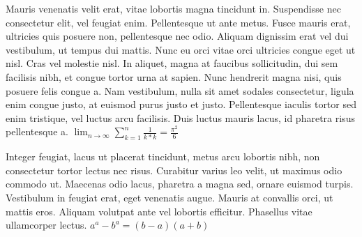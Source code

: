 \documentclass{article}
\begin{document}
Mauris venenatis velit erat, vitae lobortis magna tincidunt in. Suspendisse nec consectetur elit, vel feugiat enim. Pellentesque ut ante metus. Fusce mauris erat, ultricies quis posuere non, pellentesque nec odio. Aliquam dignissim erat vel dui vestibulum, ut tempus dui mattis. Nunc eu orci vitae orci ultricies congue eget ut nisl. Cras vel molestie nisl. In aliquet, magna at faucibus sollicitudin, dui sem facilisis nibh, et congue tortor urna at sapien.
Nunc hendrerit magna nisi, quis posuere felis congue a. Nam vestibulum, nulla sit amet sodales consectetur, ligula enim congue justo, at euismod purus justo et justo. Pellentesque iaculis tortor sed enim tristique, vel luctus arcu facilisis. Duis luctus mauris lacus, id pharetra risus pellentesque a.
\begin{math} \lim_{n \to \infty}
\sum_{k=1}^n \frac{1}{k*k}
= \frac{\pi^2}{6} \end{math}

 Integer feugiat, lacus ut placerat tincidunt, metus arcu lobortis nibh, non consectetur tortor lectus nec risus. Curabitur varius leo velit, ut maximus odio commodo ut. Maecenas odio lacus, pharetra a magna sed, ornare euismod turpis. Vestibulum in feugiat erat, eget venenatis augue. Mauris at convallis orci, ut mattis eros. Aliquam volutpat ante vel lobortis efficitur. Phasellus vitae ullamcorper lectus.
\begin{math}
    a^{a}-b^{a} = (b - a)(a + b)
\end{math}
\end{document}
